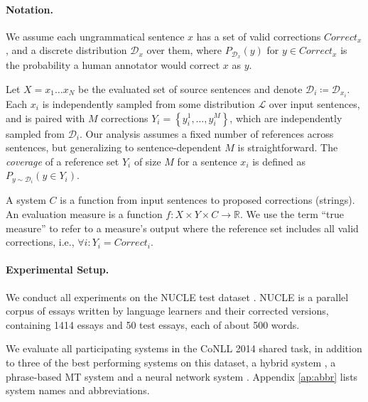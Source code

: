 \documentclass[11pt, a4paper]{article}
\begin{document}
\paragraph{Notation.}
We assume each ungrammatical sentence $x$ has a set of valid corrections $Correct_x$,
and a discrete distribution $\mathcal{D}_x$ over them, where $P_{\mathcal{D}_x}(y)$
for $y \in Correct_x$ is the probability a human annotator would correct $x$ as $y$.

Let $X=x_{1}\ldots x_{N}$ be the evaluated set of source sentences and denote $\mathcal{D}_{i}\coloneqq \mathcal{D}_{x_i}$. Each $x_{i}$ is independently sampled from some 
distribution $\mathcal{L}$ over input sentences, 
and is paired with $M$ corrections $Y_i = \left\{y_{i}^{1},\ldots, y_{i}^{M}\right\}$,
which are independently sampled from $\mathcal{D}_{i}$. Our analysis assumes a fixed number of references across sentences, 
but generalizing to sentence-dependent $M$ is straightforward.
The {\it coverage} of a reference set $Y_i$ of size $M$ for a sentence $x_i$ is defined as $P_{y \sim \mathcal{D}_i}(y \in Y_i)$.

A system $C$ is a function from input sentences to proposed corrections (strings).
An evaluation measure is a function $f\colon X \times Y \times C\to \mathbb{R}$. We use the term 
``true measure'' to refer to a measure's output where the reference set includes all valid corrections, 
i.e., $\forall i\colon Y_i=Correct_i$.

\paragraph{Experimental Setup.}\label{par:experimental_setup}
We conduct all experiments on the NUCLE test dataset \cite{dahlmeier2013building}.
NUCLE is a parallel corpus of essays written by language learners and their corrected versions,
containing 1414 essays and 50 test essays, each of about 500 words.

We evaluate all participating systems in the CoNLL 2014 shared task,
in addition to three of the best performing systems on this dataset,
a hybrid system \cite{rozovskaya2016grammatical},
a phrase-based MT system \cite{junczysdowmunt-grundkiewicz:2016:EMNLP2016} 
and a neural network system \cite{xie2016neural}.
Appendix  \ref{ap:abbr} lists system names and abbreviations.

%
\end{document}
